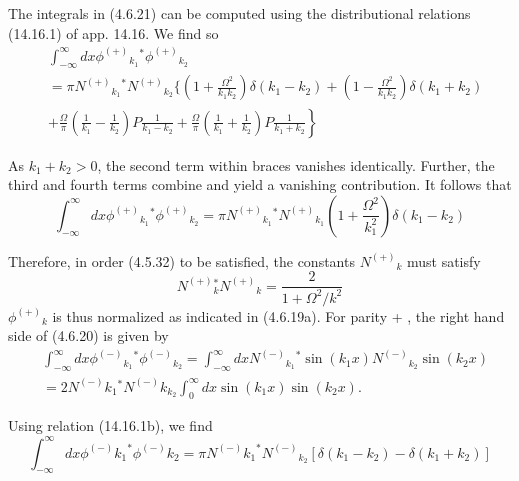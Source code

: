 \documentclass{article}
\begin{document}
The integrals in (4.6.21) can be computed using the distributional relations (14.16.1)
of app. 14.16. We find so
$$
\begin{align*}
& \int_{-\infty}^{\infty} d x \phi^{(+)}{ }_{k_{1}}{ }^{*} \phi^{(+)}{ }_{k_{2}}  \tag{4.6.22}\\
&=\pi N^{(+)}{ }_{k_{1}}{ }^{*} N^{(+)}{ }_{k_{2}}\{\left(1+\frac{\Omega^{2}}{k_{1} k_{2}}\right) \delta\left(k_{1}-k_{2}\right)+\left(1-\frac{\Omega^{2}}{k_{1} k_{2}}\right) \delta\left(k_{1}+k_{2}\right) \\
&\left.+\frac{\Omega}{\pi}\left(\frac{1}{k_{1}}-\frac{1}{k_{2}}\right) P \frac{1}{k_{1}-k_{2}}+\frac{\Omega}{\pi}\left(\frac{1}{k_{1}}+\frac{1}{k_{2}}\right) P \frac{1}{k_{1}+k_{2}}\right\}
\end{align*}
$$

As $k_{1}+k_{2}>0$, the second term within braces vanishes identically. Further, the third and fourth terms combine and yield a vanishing contribution. It follows that
$$
\begin{equation*}
\int_{-\infty}^{\infty} d x \phi^{(+)}{ }_{k_{1}}{ }^{*} \phi^{(+)}{ }_{k_{2}}=\pi N^{(+)}{ }_{k_{1}}{ }^{*} N^{(+)}{ }_{k_{1}}\left(1+\frac{\Omega^{2}}{k_{1}^{2}}\right) \delta\left(k_{1}-k_{2}\right) \tag{4.6.23}
\end{equation*}
$$

Therefore, in order (4.5.32) to be satisfied, the constants $N^{(+)}{ }_{k}$ must satisfy
$$
\begin{equation*}
N^{(+)}{ }_{k}^{*} N^{(+)}{ }_{k}=\frac{2}{1+\Omega^{2} / k^{2}} \tag{4.6.24}
\end{equation*}
$$
$\phi^{(+)}{ }_{k}$ is thus normalized as indicated in (4.6.19a).
For parity + , the right hand side of (4.6.20) is given by
$$
\begin{align*}
& \int_{-\infty}^{\infty} d x \phi^{(-)}{ }_{k_{1}}{ }^{*} \phi^{(-)}{ }_{k_{2}}=\int_{-\infty}^{\infty} d x N^{(-)}{ }_{k_{1}}{ }^{*} \sin \left(k_{1} x\right) N^{(-)}{ }_{k_{2}} \sin \left(k_{2} x\right)  \tag{4.6.25}\\
& =2 N^{(-)} k_{1}{ }^{*} N^{(-)} k_{k_{2}} \int_{0}^{\infty} d x \sin \left(k_{1} x\right) \sin \left(k_{2} x\right) .
\end{align*}
$$

Using relation (14.16.1b), we find
$$
\begin{equation*}
\int_{-\infty}^{\infty} d x \phi^{(-)}{k_{1}}^{*} \phi^{(-)} k_{2}=\pi N^{(-)}{k_{1}}^{*} N^{(-)}{ }_{k_{2}}\left[\delta\left(k_{1}-k_{2}\right)-\delta\left(k_{1}+k_{2}\right)\right] \tag{4.6.26}
\end{equation*}
$$
\end{document}
